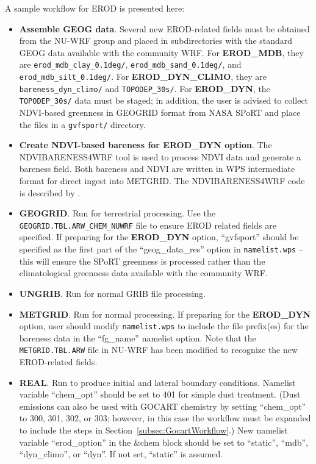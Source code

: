 A sample workflow for EROD is presented here:
\begin{itemize}
\item \textbf{Assemble GEOG data}. Several new EROD-related fields must be
obtained from the NU-WRF group and placed in subdirectories with the standard
GEOG data available with the community WRF. For \textbf{EROD\_MDB}, they are
\texttt{erod\_mdb\_clay\_0.1deg/}, \texttt{erod\_mdb\_sand\_0.1deg/}, and\\
\texttt{erod\_mdb\_silt\_0.1deg/}. For \textbf{EROD\_DYN\_CLIMO}, they are\\
\texttt{bareness\_dyn\_climo/} and \texttt{TOPODEP\_30s/}. For
\textbf{EROD\_DYN}, the \texttt{TOPODEP\_30s/} data must be staged; in 
addition, the user is advised to collect NDVI-based greenness in GEOGRID 
format from NASA SPoRT and place the files in a \texttt{gvfsport/} directory.

\item \textbf{Create NDVI-based bareness for EROD\_DYN option}. The 
NDVIBARENESS4WRF tool is used to process NDVI data and generate a bareness
field.  Both bareness and NDVI are written in WPS intermediate format for
direct ingest into METGRID.  The NDVIBARENESS4WRF code is described by
\cite{ref:NdviBareness4WrfUserGuide}.

\item \textbf{GEOGRID}. Run for terrestrial processing. Use the 
\texttt{GEOGRID.TBL.ARW\_CHEM\_NUWRF} file to ensure EROD related fields
are specified. If preparing for the \textbf{EROD\_DYN} option, ``gvfsport'' 
should be specified as the first part of the ``geog\_data\_res'' option in 
\texttt{namelist.wps} -- this will ensure the SPoRT greenness is processed
rather than the climatological greenness data available with the community
WRF.

\item \textbf{UNGRIB}. Run for normal GRIB file processing.

\item \textbf{METGRID}. Run for normal processing. If preparing for the
\textbf{EROD\_DYN} option, user should modify \texttt{namelist.wps} to 
include the file prefix(es) for the bareness data in the 
``fg\_name'' namelist option. Note that the \texttt{METGRID.TBL.ARW} file
in NU-WRF has been modified to recognize the new EROD-related fields.

\item \textbf{REAL}. Run to produce initial and lateral boundary conditions.
Namelist variable ``chem\_opt'' should be set to 401 for simple dust 
treatment. (Dust emissions can also be used with GOCART chemistry
by setting ``chem\_opt'' to 300, 301, 302, or 303; however, in this case
the workflow must be expanded to include the steps in 
Section~\ref{subsec:GocartWorkflow}.) New namelist variable ``erod\_option'' 
in the \&chem block should be set to ``static'', ``mdb'', ``dyn\_climo'', or 
``dyn''. If not set, ``static'' is assumed.


\end{itemize}
